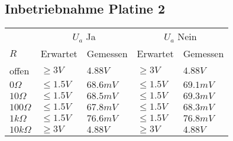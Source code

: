 \subsection{Inbetriebnahme Platine 2}
\begin{tabular}{@{}lllll}
                & \multicolumn{2}{c}{$U_a$ Ja}  & \multicolumn{2}{c}{$U_a$ Nein} \\
  $R$           & Erwartet  & Gemessen  & Erwartet  & Gemessen  \\
  offen         & $\geq3V$  & $4.88V$   & $\geq3V$  & $4.88V$   \\
  $0 \Omega$    & $\leq1.5V$& $68.6mV$  & $\leq1.5V$& $69.1mV$  \\
  $10 \Omega$   & $\leq1.5V$& $68.5mV$  & $\leq1.5V$& $69.3mV$  \\
  $100 \Omega$  & $\leq1.5V$& $67.8mV$  & $\leq1.5V$& $68.3mV$  \\
  $1 k\Omega$   & $\leq1.5V$& $76.6mV$  & $\leq1.5V$& $76.8mV$  \\
  $10 k\Omega$  & $\geq3V$  & $4.88V$   & $\geq3V$  & $4.88V$   \\
\end{tabular}